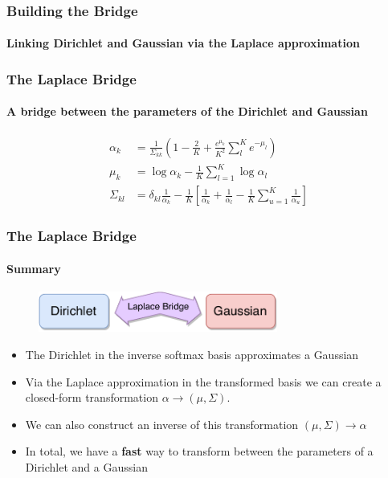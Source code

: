 \documentclass[10pt,usepdftitle=false,aspectratio=169,handout]{beamer}
\begin{document}

\setlength{\figwidth}{0.33\textwidth}
\setlength{\figheight}{0.7\textheight}

\begin{frame}\frametitle{Building the Bridge}
	\framesubtitle{Linking Dirichlet and Gaussian via the Laplace approximation}
	\begin{figure}
		\centering
		\scriptsize
		
	\end{figure}
\end{frame}


\begin{frame}\frametitle{The Laplace Bridge}
	\framesubtitle{A bridge between the parameters of the Dirichlet and Gaussian}
	\begin{align}
	\alpha_k &= \frac{1}{\Sigma_{kk}}\left(1 - \frac{2}{K} + \frac{e^{\mu_k}}{K^2}\sum_l^K e^{-\mu_l} \right)
	\label{eq:alpha_transform}
	\\
	\mu_k &= \log \alpha_k  - \frac{1}{K} \sum_{l=1}^{K} \log \alpha_l
	\\
	\Sigma_{kl} &= \delta_{kl} \frac{1}{\alpha_k} - \frac{1}{K} \left[\frac{1}{\alpha_k} + \frac{1}{\alpha_l} - \frac{1}{K} \sum_{u=1}^{K} \frac{1}{\alpha_u}\right]
	\end{align}
\end{frame}


\begin{frame}\frametitle{The Laplace Bridge}
	\framesubtitle{Summary}
	\begin{figure}
		\includegraphics[width=0.7\textwidth]{../figures/Laplace_Bridge_sketch.pdf}
	\end{figure}
	\begin{itemize}
		\item The Dirichlet in the inverse softmax basis approximates a Gaussian
		\item Via the Laplace approximation in the transformed basis we can create a closed-form transformation $\alpha \rightarrow (\mu, \Sigma)$.
		\item We can also construct an inverse of this transformation $(\mu, \Sigma) \rightarrow \alpha$
		\item In total, we have a \textbf{fast} way to transform between the parameters of a Dirichlet and a Gaussian
	\end{itemize}
\end{frame}
\end{document}
